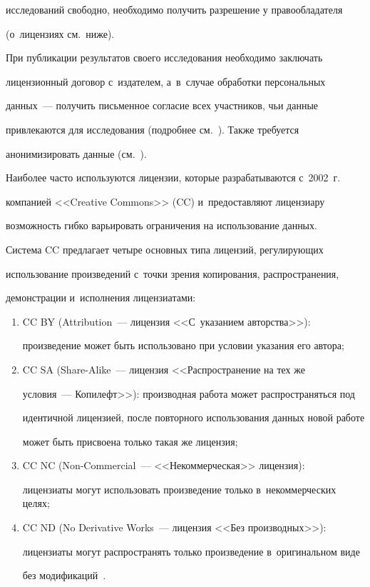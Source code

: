 исследований свободно, необходимо получить разрешение у правообладателя 

(о~лицензиях см.\ ниже).

  

  При публикации результатов своего исследования необходимо заключать 

лицензионный договор с~издателем, а~в~случае обработки персональных 

данных~--- получить письменное согласие всех участников, чьи данные 

привлекаются для исследования (подробнее см.~\cite{24-nur}). Также требуется 

анонимизировать данные (см.~\cite{25-nur}).

  

  Наиболее часто используются лицензии, которые разрабатываются с~2002~г.\ 

компанией <<Creative Commons>> (CC) и~предоставляют лицензиару 

возможность гибко варьировать ограничения на использование данных. 

Система CC предлагает четыре основных типа лицензий, регулирующих 

использование произведений с~точки зрения копирования, распространения, 

демонстрации и~исполнения лицензиатами:

  \begin{enumerate}[(1)]

\item CC BY (Attribution~--- лицензия <<С~указанием авторства>>): 

произведение может быть использовано при условии указания его автора;

\item CC SA (Share-Alike~--- лицензия <<Распространение на тех же 

условия~--- Копилефт>>): производная работа может распространяться под 

идентичной лицензией, после повторного использования данных новой работе 

может быть присвоена только такая же лицензия;

  \item CC NC (Non-Commercial~--- <<Некоммерческая>> лицензия): 

лицензиаты могут использовать произведение только в~некоммерческих целях;

\item CC ND (No Derivative Works~--- лицензия <<Без производных>>): 

лицензиаты могут распространять только произведение в~оригинальном виде 

без модификаций~\cite{26-nur}.

\end{enumerate}





